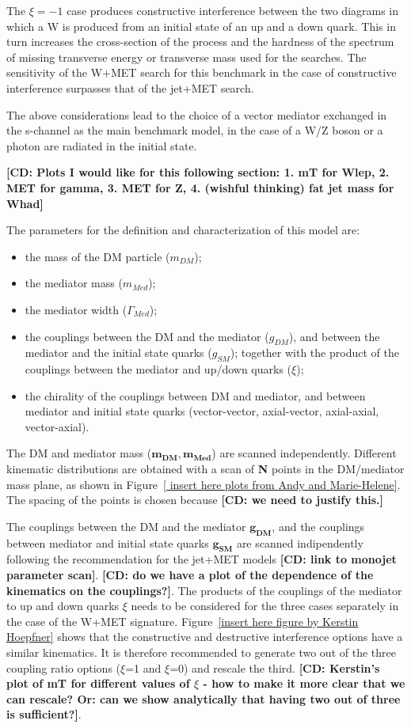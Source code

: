 The $\xi=-1$ case produces constructive interference between the two 
diagrams in which a W is produced from an initial state of an up and 
a down quark. This in turn increases the cross-section of the process 
and the hardness of the spectrum of missing transverse energy or 
transverse mass used for the searches. The sensitivity of the W+MET search for 
this benchmark in the case of constructive interference surpasses 
that of the jet+MET search. 

The above considerations lead to the choice of a vector mediator exchanged in the s-channel
as the main benchmark model, in the case of a W/Z boson or a photon are 
radiated in the initial state. 

\textbf{[CD: Plots I would like for this following section:
1. mT for Wlep, 2. MET for gamma, 3. MET for Z, 4. (wishful thinking) fat jet mass for Whad]}

The parameters for the definition and characterization of this model are: 
\begin{itemize}
 \item the mass of the DM particle ($m_{DM}$);
 \item the mediator mass ($m_{Med}$);
 \item the mediator width ($\Gamma_{Med}$);
 \item the couplings between the DM and the mediator ($g_{DM}$), 
 and between the mediator and the initial state quarks ($g_{SM}$);
 together with the product of the couplings between the mediator and up/down quarks ($\xi$);
 \item the chirality of the couplings between DM and mediator, 
 and between mediator and initial state quarks (vector-vector, axial-vector, axial-axial, vector-axial).
\end{itemize}

The DM and mediator mass ($\mathbf{m_{DM},m_{Med}}$) are scanned independently. 
Different kinematic distributions are obtained with a scan of 
\textbf{N} points in the DM/mediator mass plane, as shown in Figure~\ref{
insert here plots from Andy and Marie-Helene}. The spacing
of the points is chosen because \textbf{[CD: we need to justify this.]}

The couplings between the DM and the mediator $\mathbf{g_{DM}}$, and the couplings
between mediator and initial state quarks $\mathbf{g_{SM}}$ are scanned indipendently
following the recommendation for the jet+MET models
\textbf{[CD: link to monojet parameter scan]}. 
\textbf{[CD: do we have a plot of the dependence of the kinematics on the couplings?]}. 
The products of the couplings of the mediator to up and down quarks $\xi$ needs to be considered
for the three cases separately in the case of the W+MET signature. 
Figure~\ref{insert here figure by Kerstin Hoepfner} shows that
the constructive and destructive interference options have 
a similar kinematics. It is therefore recommended to generate 
two out of the three coupling ratio options ($\xi$=1 and $\xi$=0) and rescale 
the third. 
\textbf{[CD: Kerstin's plot of mT for different values of $\xi$ - 
how to make it more clear that we can rescale?
Or: can we show analytically that having two out of three is sufficient?]}. 

